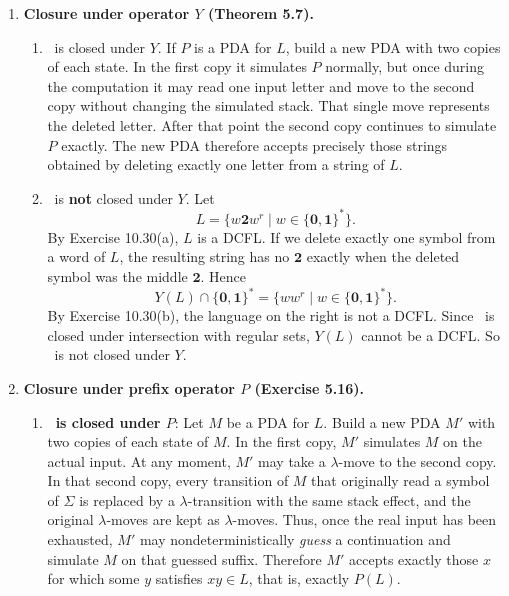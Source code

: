 \begin{enumerate}[{10.}1. ]
\begin{enumerate}
\item \ASIG\ is \textbf{not} closed under $b$. Let
\[
A=\{\pmb{a}^n\pmb{b}^n\pmb{c}^m\pmb{\#\#}\pmb{d}^{3m}\mid n,m\ge 0\}.
\]
This language is accepted by a DPDA: deterministically match the $\pmb{a}$'s
against the $\pmb{b}$'s, then push three markers for each $\pmb{c}$, read the
fixed delimiter $\pmb{\#\#}$, and pop one marker for each $\pmb{d}$. Thus
$A\in\ASIG$, but $A^b$ is not even context free by part (a). So \ASIG\ is not
closed under $b$.
\end{enumerate}

\item \textbf{Closure under operator $Y$ (Theorem 5.7).}

\begin{enumerate}
\item \PSIG\ is closed under $Y$. If $P$ is a PDA for $L$, build a new PDA with two copies of each state. In the first copy it simulates $P$ normally, but once during the computation it may read one input letter and move to the second copy without changing the simulated stack. That single move represents the deleted letter. After that point the second copy continues to simulate $P$ exactly. The new PDA therefore accepts precisely those strings obtained by deleting exactly one letter from a string of $L$.

\item \ASIG\ is \textbf{not} closed under $Y$. Let
\[
L=\{w\pmb{2}w^r\mid w\in\{\pmb{0},\pmb{1}\}^*\}.
\]
By Exercise 10.30(a), $L$ is a DCFL. If we delete exactly one symbol from a word of $L$, the resulting string has no $\pmb{2}$ exactly when the deleted symbol was the middle $\pmb{2}$. Hence
\[
Y(L)\cap\{\pmb{0},\pmb{1}\}^*=\{ww^r\mid w\in\{\pmb{0},\pmb{1}\}^*\}.
\]
By Exercise 10.30(b), the language on the right is not a DCFL. Since \ASIG\ is closed under intersection with regular sets, $Y(L)$ cannot be a DCFL. So \ASIG\ is not closed under $Y$.
\end{enumerate}

\item \textbf{Closure under prefix operator $P$ (Exercise 5.16).}

\begin{enumerate}
\item \textbf{\PSIG\ is closed under $P$}: Let $M$ be a PDA for $L$. Build a new PDA $M'$ with two copies of each state of $M$. In the first copy, $M'$ simulates $M$ on the actual input. At any moment, $M'$ may take a $\lambda$-move to the second copy. In that second copy, every transition of $M$ that originally read a symbol of $\Sigma$ is replaced by a $\lambda$-transition with the same stack effect, and the original $\lambda$-moves are kept as $\lambda$-moves. Thus, once the real input has been exhausted, $M'$ may nondeterministically \emph{guess} a continuation and simulate $M$ on that guessed suffix. Therefore $M'$ accepts exactly those $x$ for which some $y$ satisfies $xy\in L$, that is, exactly $P(L)$.


\end{enumerate}
\end{enumerate}
